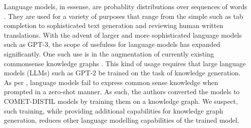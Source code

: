 \documentclass[\main/thesis.tex]{subfiles}
\begin{document}
Language models, in essense, are probablity distributions over sequences of words \cite{jurafsky_speech_2009}. 
They are used for a variety of purposes that range from the simple such as tab completion to 
sophisticated text generation and reviewing human written translations. 
With the advent of larger and more sophisticated language models such as GPT-3\cite{brown_language_2020}, the scope
of usefuless for language models has expanded significantly. One such use is in the 
augmentation of currently existing commonsense knowledge graphs \cite{west_symbolic_2021}.
This kind of usage requires that large language models (LLMs) such as GPT-2 be trained on the task
of knowledge generation. As per \citeauthor{west_symbolic_2021}, language models fail to express common 
sense knowledge when prompted in a zero-shot manner. As such, the authors converted the models
to COMET-DISTIL models by training them on a knowledge graph. We suspect, such training, while providing 
additional capabilities for knowledge graph generation, reduces other language modelling capabilities
of the trained model. 
\end{document}
